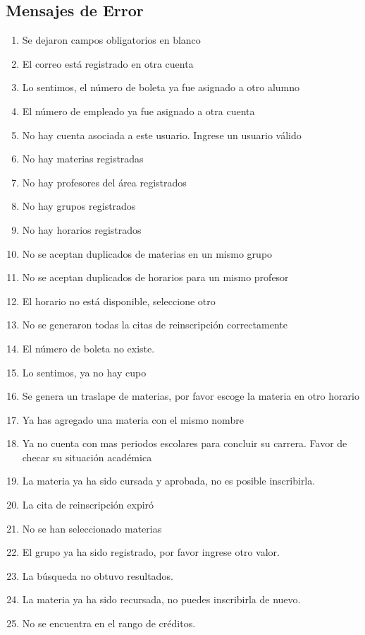 \subsection{Mensajes de Error}
\begin{enumerate}[{ME} 1.]
\item Se dejaron campos obligatorios en blanco
\item El correo está registrado en otra cuenta
\item Lo sentimos, el número de boleta ya fue asignado a otro alumno
\item El número de empleado ya fue asignado a otra cuenta
\item No hay cuenta asociada a este usuario. Ingrese un usuario válido
\item No hay materias registradas
\item No hay profesores del área registrados
\item No hay grupos registrados
\item No hay horarios registrados
\item No se aceptan duplicados de materias en un mismo grupo
\item No se aceptan duplicados de horarios para un mismo profesor
\item El horario no está disponible, seleccione otro
\item No se generaron todas la citas de reinscripción correctamente
\item El número de boleta no existe.
\item Lo sentimos, ya no hay cupo
\item Se genera un traslape de materias, por favor escoge la materia en otro horario
\item Ya has agregado una materia con el mismo nombre
\item Ya no cuenta con mas periodos escolares para concluir su carrera. Favor de checar su situación académica
\item La materia ya ha sido cursada y aprobada, no es posible inscribirla.
\item La cita de reinscripción expiró
\item No se han seleccionado materias
\item El grupo ya ha sido registrado, por favor ingrese otro valor.
\item La búsqueda no obtuvo resultados.
\item La materia ya ha sido recursada, no puedes inscribirla de nuevo.
\item No se encuentra en el rango de créditos.

\end{enumerate}
